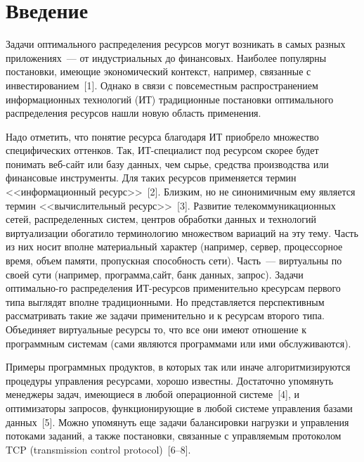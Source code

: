 \begin{multicols}{2}

\label{st\stat}

\section{Введение} %

 Задачи оптимального распределения ресурсов могут возникать в самых
разных приложениях~--- от индустриальных до финансовых. Наиболее
популярны постановки, имеющие экономический контекст, например,
связанные с инвестированием~[1]. Однако в связи с повсеместным
распространением информационных технологий (ИТ) традиционные постановки
оптимального распределения ресурсов нашли новую область применения.

 Надо отметить, что понятие ресурса благодаря
ИТ приобрело множество специфических оттенков. Так,
 ИТ-спе\-ци\-а\-лист под ресурсом скорее будет понимать веб-сайт или
базу данных, чем сырье, средства производства или финансовые инстру\-менты.
Для таких ресурсов применяется термин <<информационный ресурс>>~[2].
Близким, но не синонимичным ему является термин <<вычислительный
ресурс>>~[3]. Развитие телекоммуникационных сетей, распределенных сис\-тем,
центров обработки данных и технологий виртуализации обогатило
терминологию множеством вариаций на эту тему. Часть из них носит вполне
материальный характер (например, сервер, процессорное время, объем памяти,
пропускная способность сети). Часть~--- виртуальны по своей сути (например,
программа,\linebreak сайт, банк данных, запрос). Задачи оптимально-\linebreak го распределения
ИТ-ре\-сур\-сов применительно к\linebreak ресурсам первого типа выглядят вполне
традиционными. Но представляется перспективным рас\-смат\-ри\-вать такие же
задачи применительно и к ресурсам второго типа. Объединяет виртуальные
ресурсы то, что все они имеют отношение к программным системам (сами
являются программами или ими обслуживаются).

Примеры программных
продуктов, в которых так или иначе алгоритмизируются процедуры управления
ресурсами, хорошо известны. Достаточно упомянуть менеджеры задач,
имеющиеся в любой операционной системе~[4], и оптимизаторы запросов,
функционирующие в любой системе управления базами данных~[5]. Можно
упомянуть еще задачи балансировки нагрузки и управления потоками заданий,
а также постановки, связанные с управляемым протоколом TCP
(transmission control protocol)~[6--8].


\end{multicols}
